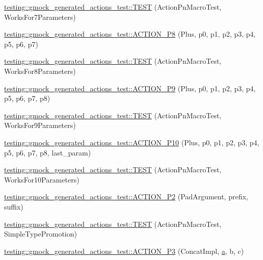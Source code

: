 \begin{DoxyCompactItemize}
\item 
\hyperlink{namespacetesting_1_1gmock__generated__actions__test_add3cba52186c7ce384808c222492ee18}{testing\+::gmock\+\_\+generated\+\_\+actions\+\_\+test\+::\+T\+E\+ST} (Action\+Pn\+Macro\+Test, Works\+For7\+Parameters)
\item 
\hyperlink{namespacetesting_1_1gmock__generated__actions__test_ad8766a6dbaeffbf36658d3b5f75d3b00}{testing\+::gmock\+\_\+generated\+\_\+actions\+\_\+test\+::\+A\+C\+T\+I\+O\+N\+\_\+\+P8} (Plus, p0, p1, p2, p3, p4, p5, p6, p7)
\item 
\hyperlink{namespacetesting_1_1gmock__generated__actions__test_a1913bedf1d5cf736e91f2be119de0d5f}{testing\+::gmock\+\_\+generated\+\_\+actions\+\_\+test\+::\+T\+E\+ST} (Action\+Pn\+Macro\+Test, Works\+For8\+Parameters)
\item 
\hyperlink{namespacetesting_1_1gmock__generated__actions__test_ab023ad5e95ca2c2b8845963ce7222e00}{testing\+::gmock\+\_\+generated\+\_\+actions\+\_\+test\+::\+A\+C\+T\+I\+O\+N\+\_\+\+P9} (Plus, p0, p1, p2, p3, p4, p5, p6, p7, p8)
\item 
\hyperlink{namespacetesting_1_1gmock__generated__actions__test_a52d6dc447a4a71524adfeb7c8f7b6a68}{testing\+::gmock\+\_\+generated\+\_\+actions\+\_\+test\+::\+T\+E\+ST} (Action\+Pn\+Macro\+Test, Works\+For9\+Parameters)
\item 
\hyperlink{namespacetesting_1_1gmock__generated__actions__test_a3c6e7ef6aefc94efc9e815e92f0b3e47}{testing\+::gmock\+\_\+generated\+\_\+actions\+\_\+test\+::\+A\+C\+T\+I\+O\+N\+\_\+\+P10} (Plus, p0, p1, p2, p3, p4, p5, p6, p7, p8, last\+\_\+param)
\item 
\hyperlink{namespacetesting_1_1gmock__generated__actions__test_a564fd77344f58b26577452a380c93935}{testing\+::gmock\+\_\+generated\+\_\+actions\+\_\+test\+::\+T\+E\+ST} (Action\+Pn\+Macro\+Test, Works\+For10\+Parameters)
\item 
\hyperlink{namespacetesting_1_1gmock__generated__actions__test_ad58030fe83ad47cdb4ff027f8399adb4}{testing\+::gmock\+\_\+generated\+\_\+actions\+\_\+test\+::\+A\+C\+T\+I\+O\+N\+\_\+\+P2} (Pad\+Argument, prefix, suffix)
\item 
\hyperlink{namespacetesting_1_1gmock__generated__actions__test_ad42236ad6c6d01fad6dd947ca6163d59}{testing\+::gmock\+\_\+generated\+\_\+actions\+\_\+test\+::\+T\+E\+ST} (Action\+Pn\+Macro\+Test, Simple\+Type\+Promotion)
\item 
\hyperlink{namespacetesting_1_1gmock__generated__actions__test_ae46434959151b83249e52d4869e28cf0}{testing\+::gmock\+\_\+generated\+\_\+actions\+\_\+test\+::\+A\+C\+T\+I\+O\+N\+\_\+\+P3} (Concat\+Impl, \hyperlink{_07copy_08_2_read_camera_model_8m_a551a3d351eadcc0b9b1a2f24f0fb5ea0}{a}, b, c)

\end{DoxyCompactItemize}
